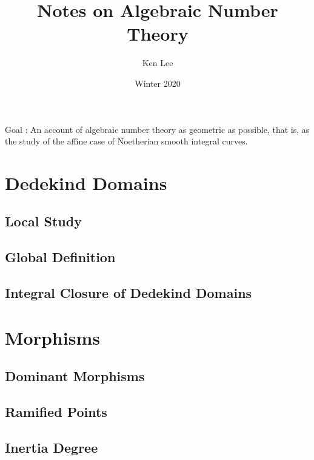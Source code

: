 \documentclass{article}
\begin{document}
\title{Notes on Algebraic Number Theory}

\author{Ken Lee}
\date{Winter 2020}
\maketitle

Goal : An account of algebraic number theory as 
geometric as possible, that is, 
as the study of the affine case of Noetherian smooth integral curves.

\tableofcontents

\section{Dedekind Domains}
  \subsection{Local Study}
  \subsection{Global Definition}
  \subsection{Integral Closure of Dedekind Domains}
\section{Morphisms}
  \subsection{Dominant Morphisms}
  \subsection{Ramified Points}
  \subsection{Inertia Degree}
\end{document}
